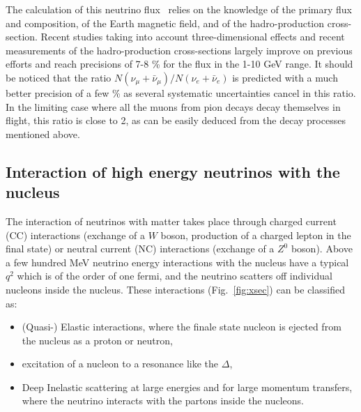 The calculation of this neutrino flux~\cite{Gaisser:2002jj} relies on the knowledge of the primary flux and composition, of the Earth magnetic field, and of the hadro-production cross-section. Recent studies \cite{PhysRevD.83.123001,Barr:2004br,Battistoni:2002ew} taking into account three-dimensional effects and recent measurements of the hadro-production cross-sections largely improve on previous efforts and reach precisions of 7-8 \% for the flux in the 1-10 GeV range. It should be noticed that the ratio $N(\nu_\mu + \bar{\nu}_\mu)/N(\nu_e + \bar{\nu}_e)$ is predicted with a much better precision of a few \% as several systematic uncertainties cancel in this ratio. In the limiting case where all the muons from pion decays decay themselves in flight, this ratio is close to 2, as can be easily deduced from the decay processes mentioned above.


\subsection{Interaction of high energy neutrinos with the nucleus}

The interaction of neutrinos with matter takes place through charged current (CC) interactions (exchange of a $W$ boson, production of a charged lepton in the final state) or neutral current (NC) interactions (exchange of a $Z^0$ boson). 
Above a few hundred MeV neutrino energy interactions with the nucleus have a typical $q^2$ which is of the order of one fermi, and the neutrino scatters off individual nucleons inside the nucleus. These interactions (Fig.~\ref{fig:xsec}) can be classified as:
\begin{itemize}
  \item (Quasi-) Elastic interactions, where the finale state nucleon is ejected from the nucleus as a proton or neutron, 
  \item excitation of a nucleon to a resonance like the $\Delta$,
  \item Deep Inelastic scattering at large energies and for large momentum transfers, where the neutrino interacts with the partons inside the nucleons.
  \end{itemize}  

